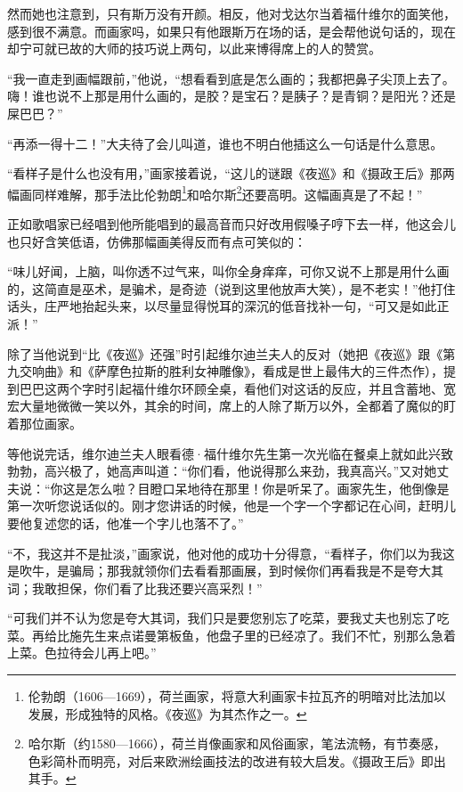 \par 然而她也注意到，只有斯万没有开颜。相反，他对戈达尔当着福什维尔的面笑他，感到很不满意。而画家吗，如果只有他跟斯万在场的话，是会帮他说句话的，现在却宁可就已故的大师的技巧说上两句，以此来博得席上的人的赞赏。
\par “我一直走到画幅跟前，”他说，“想看看到底是怎么画的；我都把鼻子尖顶上去了。嗨！谁也说不上那是用什么画的，是胶？是宝石？是胰子？是青铜？是阳光？还是屎巴巴？”
\par “再添一得十二！”大夫待了会儿叫道，谁也不明白他插这么一句话是什么意思。
\par “看样子是什么也没有用，”画家接着说，“这儿的谜跟《夜巡》和《摄政王后》那两幅画同样难解，那手法比伦勃朗\footnote{伦勃朗（1606—1669），荷兰画家，将意大利画家卡拉瓦齐的明暗对比法加以发展，形成独特的风格。《夜巡》为其杰作之一。}和哈尔斯\footnote{哈尔斯（约1580—1666），荷兰肖像画家和风俗画家，笔法流畅，有节奏感，色彩简朴而明亮，对后来欧洲绘画技法的改进有较大启发。《摄政王后》即出其手。}还要高明。这幅画真是了不起！”
\par 正如歌唱家已经唱到他所能唱到的最高音而只好改用假嗓子哼下去一样，他这会儿也只好含笑低语，仿佛那幅画美得反而有点可笑似的：
\par “味儿好闻，上脑，叫你透不过气来，叫你全身痒痒，可你又说不上那是用什么画的，这简直是巫术，是骗术，是奇迹（说到这里他放声大笑），是不老实！”他打住话头，庄严地抬起头来，以尽量显得悦耳的深沉的低音找补一句，“可又是如此正派！”
\par 除了当他说到“比《夜巡》还强”时引起维尔迪兰夫人的反对（她把《夜巡》跟《第九交响曲》和《萨摩色拉斯的胜利女神雕像》，看成是世上最伟大的三件杰作），提到巴巴这两个字时引起福什维尔环顾全桌，看他们对这话的反应，并且含蓄地、宽宏大量地微微一笑以外，其余的时间，席上的人除了斯万以外，全都着了魔似的盯着那位画家。
\par 等他说完话，维尔迪兰夫人眼看德·福什维尔先生第一次光临在餐桌上就如此兴致勃勃，高兴极了，她高声叫道：“你们看，他说得那么来劲，我真高兴。”又对她丈夫说：“你这是怎么啦？目瞪口呆地待在那里！你是听呆了。画家先生，他倒像是第一次听您说话似的。刚才您讲话的时候，他是一个字一个字都记在心间，赶明儿要他复述您的话，他准一个字儿也落不了。”
\par “不，我这并不是扯淡，”画家说，他对他的成功十分得意，“看样子，你们以为我这是吹牛，是骗局；那我就领你们去看看那画展，到时候你们再看我是不是夸大其词；我敢担保，你们看了比我还要兴高采烈！”
\par “可我们并不认为您是夸大其词，我们只是要您别忘了吃菜，要我丈夫也别忘了吃菜。再给比施先生来点诺曼第板鱼，他盘子里的已经凉了。我们不忙，别那么急着上菜。色拉待会儿再上吧。”
